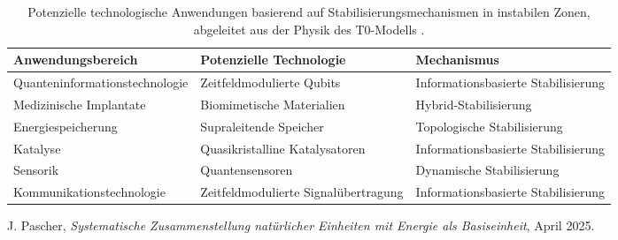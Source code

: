 \documentclass[12pt,a4paper]{article}
\begin{document}
	\begin{table}[h]
		\centering
		\begin{adjustbox}{scale=0.8}
			\begin{tabular}{lll}
				\hline
				\textbf{Anwendungsbereich} & \textbf{Potenzielle Technologie} & \textbf{Mechanismus} \\
				\hline
				Quanteninformationstechnologie & Zeitfeldmodulierte Qubits & Informationsbasierte Stabilisierung \\
				Medizinische Implantate & Biomimetische Materialien & Hybrid-Stabilisierung \\
				Energiespeicherung & Supraleitende Speicher & Topologische Stabilisierung \\
				Katalyse & Quasikristalline Katalysatoren & Informationsbasierte Stabilisierung \\
				Sensorik & Quantensensoren & Dynamische Stabilisierung \\
				Kommunikationstechnologie & Zeitfeldmodulierte Signalübertragung & Informationsbasierte Stabilisierung \\
				\hline
			\end{tabular}
		\end{adjustbox}
		\caption{Potenzielle technologische Anwendungen basierend auf Stabilisierungsmechanismen in instabilen Zonen, abgeleitet aus der Physik des T0-Modells \cite{pascher_nateinheiten_2025}.}
		\label{tab:applications}
	\end{table}
	
	
	\begin{thebibliography}{99}
		 J. Pascher, \textit{Systematische Zusammenstellung natürlicher Einheiten mit Energie als Basiseinheit}, April 2025.
	\end{thebibliography}
	
\end{document}
